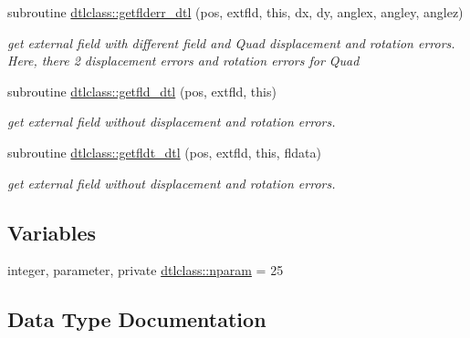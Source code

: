 \begin{DoxyCompactItemize}
subroutine \mbox{\hyperlink{namespacedtlclass_ab866f108c00b307f9e7a55731eadafa4}{dtlclass\+::getflderr\+\_\+dtl}} (pos, extfld, this, dx, dy, anglex, angley, anglez)
\begin{DoxyCompactList}\small\item\em get external field with different field and Quad displacement and rotation errors. Here, there 2 displacement errors and rotation errors for Quad \end{DoxyCompactList}\item 
subroutine \mbox{\hyperlink{namespacedtlclass_a9e97d93c8f7ec49afee134e3ffd3f900}{dtlclass\+::getfld\+\_\+dtl}} (pos, extfld, this)
\begin{DoxyCompactList}\small\item\em get external field without displacement and rotation errors. \end{DoxyCompactList}\item 
subroutine \mbox{\hyperlink{namespacedtlclass_aef6d69ea2a551751181175c270a8b745}{dtlclass\+::getfldt\+\_\+dtl}} (pos, extfld, this, fldata)
\begin{DoxyCompactList}\small\item\em get external field without displacement and rotation errors. \end{DoxyCompactList}\end{DoxyCompactItemize}
\subsection*{Variables}
\begin{DoxyCompactItemize}
\item 
integer, parameter, private \mbox{\hyperlink{namespacedtlclass_adf04761c96168c3dc492c89c72194cea}{dtlclass\+::nparam}} = 25
\end{DoxyCompactItemize}


\subsection{Data Type Documentation}
\label{structdtlclass_1_1dtl}
